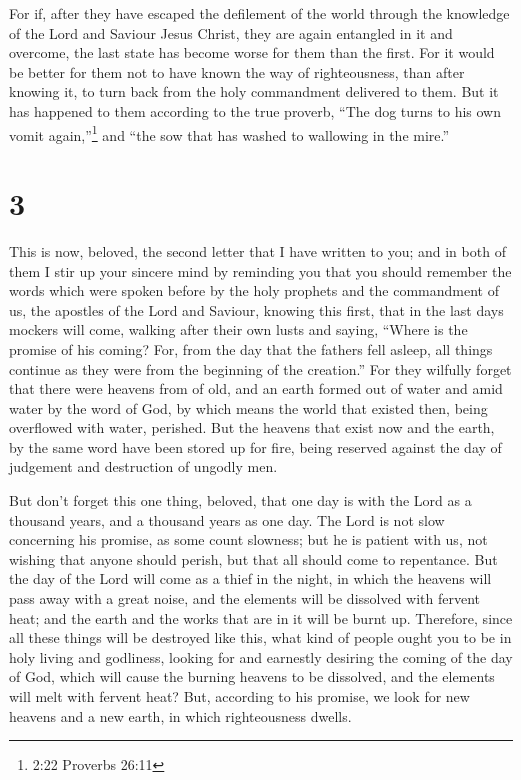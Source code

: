  For if, after they have escaped the defilement of the
world through the knowledge of the Lord and Saviour Jesus Christ, they
are again entangled in it and overcome, the last state has become worse
for them than the first.  For it would be better for them
not to have known the way of righteousness, than after knowing it, to
turn back from the holy commandment delivered to them.  But
it has happened to them according to the true proverb, ``The dog turns
to his own vomit again,''\footnote{2:22 Proverbs 26:11} and ``the sow
that has washed to wallowing in the mire.''

\hypertarget{section-2}{%
\section{3}\label{section-2}}

 This is now, beloved, the second letter that I have written
to you; and in both of them I stir up your sincere mind by reminding you
 that you should remember the words which were spoken before
by the holy prophets and the commandment of us, the apostles of the Lord
and Saviour,  knowing this first, that in the last days
mockers will come, walking after their own lusts  and
saying, ``Where is the promise of his coming? For, from the day that the
fathers fell asleep, all things continue as they were from the beginning
of the creation.''  For they wilfully forget that there were
heavens from of old, and an earth formed out of water and amid water by
the word of God,  by which means the world that existed
then, being overflowed with water, perished.  But the
heavens that exist now and the earth, by the same word have been stored
up for fire, being reserved against the day of judgement and destruction
of ungodly men.

 But don't forget this one thing, beloved, that one day is
with the Lord as a thousand years, and a thousand years as one day.
 The Lord is not slow concerning his promise, as some count
slowness; but he is patient with us, not wishing that anyone should
perish, but that all should come to repentance.  But the
day of the Lord will come as a thief in the night, in which the heavens
will pass away with a great noise, and the elements will be dissolved
with fervent heat; and the earth and the works that are in it will be
burnt up.  Therefore, since all these things will be
destroyed like this, what kind of people ought you to be in holy living
and godliness,  looking for and earnestly desiring the
coming of the day of God, which will cause the burning heavens to be
dissolved, and the elements will melt with fervent heat? 
But, according to his promise, we look for new heavens and a new earth,
in which righteousness dwells.


